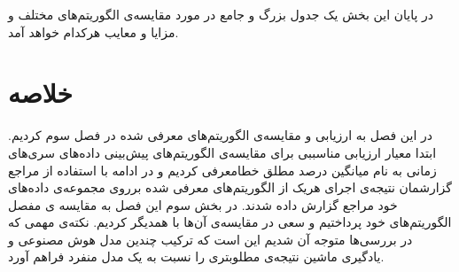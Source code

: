     در پایان این بخش یک جدول بزرگ و جامع در مورد مقایسه‌ی الگوریتم‌های مختلف و مزایا و معایب هرکدام خواهد آمد.
\section{خلاصه}


در این فصل به ارزیابی و مقایسه‌ی الگوریتم‌های معرفی شده در فصل سوم کردیم. ابتدا معیار ارزیابی مناسببی برای مقایسه‌ی الگوریتم‌های پیش‌بینی داده‌های سری‌های زمانی
به نام میانگین درصد مطلق خطا\footnotemark[1]
معرفی کردیم و در ادامه با استفاده از مراجع گزارشمان نتیجه‌ی اجرای هریک از الگوریتم‌های معرفی شده برروی مجموعه‌ی داده‌های خود مراجع گزارش داده شدند. 
در بخش سوم این فصل به مقایسه ی مفصل الگوریتم‌های خود پرداختیم و سعی در مقایسه‌ی آن‌ها با همدیگر کردیم. 
نکته‌ی مهمی که در بررسی‌ها متوجه آن شدیم این است که ترکیب چندین مدل هوش مصنوعی و یادگیری ماشین نتیجه‌ی مطلوبتری را
نسبت به یک مدل منفرد فراهم آورد. 

